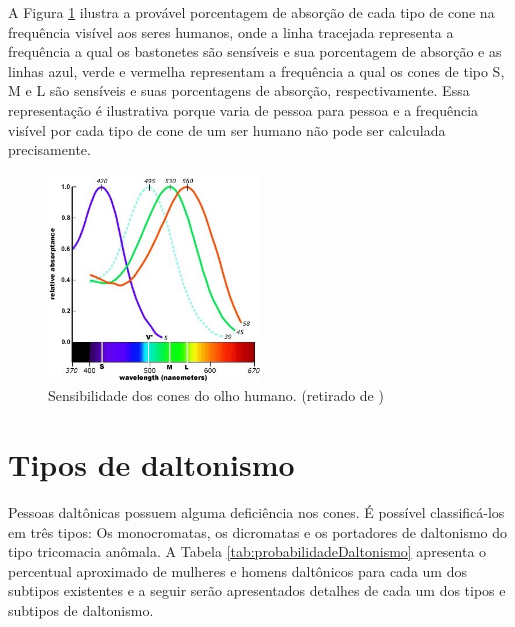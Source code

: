\documentclass[	12pt, Times, openright, twoside, a4paper, english, brazil]{abntex2}
\begin{document}
A Figura \ref{fig:figuraSensibilidadeCones} ilustra a provável porcentagem de absorção de cada tipo de cone na frequência visível aos seres humanos, onde a linha tracejada representa a frequência a qual os bastonetes são sensíveis e sua porcentagem de absorção e as linhas azul, verde e vermelha representam a frequência a qual os cones de tipo S, M e L são sensíveis e suas porcentagens de absorção, respectivamente. Essa representação é ilustrativa porque varia de pessoa para pessoa e a frequência visível por cada tipo de cone de um ser humano não pode ser calculada precisamente.

\begin{figure}[!htb]
\centering \includegraphics[width=0.5\textwidth]{figuraSensibilidadeCones.jpg}
\caption{Sensibilidade dos cones do olho humano. (retirado de ) \label{fig:figuraSensibilidadeCones}}
\end{figure}

\section{Tipos de daltonismo}
\label{sec:tiposDaltonismo}
Pessoas daltônicas possuem alguma deficiência nos cones. É possível classificá-los em três tipos: Os monocromatas, os dicromatas e os portadores de daltonismo do tipo tricomacia anômala. A Tabela \ref{tab:probabilidadeDaltonismo} apresenta o percentual aproximado de mulheres e homens daltônicos para cada um dos subtipos existentes e a seguir serão apresentados detalhes de cada um dos tipos e subtipos de daltonismo.
\end{document}
